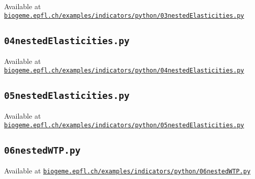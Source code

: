 \documentclass[12pt,a4paper]{article}
\begin{document}
Available at \href{http://biogeme.epfl.ch/examples/indicators/python/03nestedElasticities.py}{\lstinline$biogeme.epfl.ch/examples/indicators/python/03nestedElasticities.py$}


\subsection{\lstinline$04nestedElasticities.py$}
\label{sec:04nestedElasticities}

Available at \href{http://biogeme.epfl.ch/examples/indicators/python/04nestedElasticities.py}{\lstinline$biogeme.epfl.ch/examples/indicators/python/04nestedElasticities.py$}


\subsection{\lstinline$05nestedElasticities.py$}
\label{sec:05nestedElasticities}

Available at \href{http://biogeme.epfl.ch/examples/indicators/python/05nestedElasticities.py}{\lstinline$biogeme.epfl.ch/examples/indicators/python/05nestedElasticities.py$}


\subsection{\lstinline$06nestedWTP.py$}
\label{sec:06nestedWTP}

Available at \href{http://biogeme.epfl.ch/examples/indicators/python/06nestedWTP.py}{\lstinline$biogeme.epfl.ch/examples/indicators/python/06nestedWTP.py$}







\clearpage 



\end{document}
